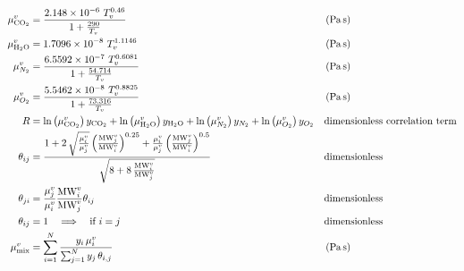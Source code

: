                 \begin{align}
                    \mu ^{\vap}_{\COtwo} &= \frac{2.148 \times 10^{-6} \ T_v^{0.46}}{1+\frac{290}{T_v}}
                    && \left(\unit{Pa\,s}\right)\\
                    \mu ^{\vap}_{\HtwoO} &= 1.7096\times 10^{-8} \ T_v^{1.1146}
                    && \left(\unit{Pa\,s}\right)\\
                    \mu ^{\vap}_{N_2} &= \frac{6.5592\times 10^{-7} \ T_v^{0.6081}}{1+\frac{54.714}{T_v}}
                    && \left(\unit{Pa\,s}\right)\\
                    \mu ^{\vap}_{O_2} &= \frac{5.5462\times 10^{-8} \ T_v^{0.8825}}{1+\frac{73.316}{T_v}}
                    && \left(\unit{Pa\,s}\right)\\
                    R &= \ln\left(\mu^{\vap}_{\COtwo}\right) y_{\COtwo}+\ln\left(\mu^{\vap}_{\HtwoO}\right) y_{\HtwoO}+\ln\left(\mu^{\vap}_{N_2}\right) y_{N_2}+\ln\left(\mu^{\vap}_{O_2}\right) y_{O_2}
                    && \text{dimensionless correlation term}\\
                    \theta_{ij} &= \frac{1 + 2\,\sqrt{\frac{\mu^{\vap}_{i}}{\mu^{\vap}_{j}}}\left(\frac{\text{MW}^{\vap}_{j}}{\text{MW}^{\vap}_{i}}\right)^{0.25} + \frac{\mu^{\vap}_{i}}{\mu^{\vap}_{j}}\left(\frac{\text{MW}^{\vap}_{j}}{\text{MW}^{\vap}_{i}}\right)^{0.5}}{\sqrt{8 + 8\,\frac{\text{MW}^{\vap}_{i}}{\text{MW}^{\vap}_{j}}}}
                    && \text{dimensionless}\\
                    \theta_{ji} &= \frac{\mu ^{\vap}_{j}}{\mu ^{\vap}_{i}}\frac{\text{MW}^{\vap}_{i}}{\text{MW}^{\vap}_{j}}\theta_{ij}
                    && \text{dimensionless}\\
                    \theta_{ij} &= 1 \quad\Longrightarrow\quad \text{if } i = j
                    && \text{dimensionless}\\
                    \mu^{\vap}_{\text{mix}} &= \sum_{i=1}^{N} \frac{y_i \,\mu^{\vap}_{i}}{\sum_{j=1}^{N} y_j \,\theta_{i,j}}
                    && \left(\unit{Pa\,s}\right)
                \end{align}

